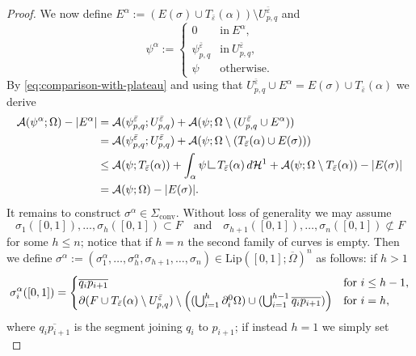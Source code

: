 \documentclass[11pt]{article}
\numberwithin{equation}{section}
\let\eps\varepsilon
\let\Om\Omega
\newcommand{\Lip}{\mathrm{Lip}}
\newcommand{\resa}{\mathop{\hbox{\vrule height 7pt width 0.5pt depth 0pt
\vrule height 0.5pt width 6pt depth 0pt}}\nolimits}
\newcommand{\resb}{\mathop{\hbox{\vrule height 4pt width 0.5pt depth 0pt
\vrule height 0.5pt width 3pt depth 0pt}}\nolimits}
\newcommand{\res}{\mathchoice{\resa}{\resa}{\resb}{\resb}}
\theoremstyle{definition}
\begin{document}
\begin{proof}
We now define $E^\alpha:=(E(\sigma)\cup T_{\bar\eps}(\alpha))\setminus U^{\bar\eps}_{p,q}$ and
\begin{equation*}
\psi^\alpha:=\begin{cases}
0&\text{in}\ E^\alpha,\\
\psi^{\bar\eps}_{p,q}& \text{in}\ U^{\bar\eps}_{p,q}, \\
\psi& \text{otherwise}.
\end{cases}
\end{equation*}
By \eqref{eq:comparison-with-plateau} and using that $U^{\bar\eps}_{p,q}\cup E^\alpha=E(\sigma)\cup T_{\bar\eps}(\alpha)$ we derive
\begin{align}
\mathcal{A}(\psi^\alpha;\Om)-|E^\alpha|
&= \mathcal A(\psi^{\bar\eps}_{p,q};U^{\bar\eps}_{p,q})+
\mathcal{A}(\psi; \Om\setminus(U^{\bar\eps}_{p,q}\cup E^\alpha))\notag
\\
&= \mathcal A(\psi^{\bar\eps}_{p,q};U^{\bar\eps}_{p,q})+
\mathcal{A}(\psi; \Om\setminus(T_{\bar\eps}(\alpha)\cup E(\sigma)))\notag\\[-8pt]\label{eq:area_psi'}\\[-8pt]
&\le \mathcal A(\psi; T_{\bar\eps}(\alpha))+
\int_{\alpha}\psi\res{T_{\bar\eps}(\alpha)}\,d\mathcal{H}^1+\mathcal{A}(\psi; \Omega\setminus T_{\bar\eps}(\alpha))-|E(\sigma)|\notag
\\
&=\mathcal{A}(\psi; \Omega)-|E(\sigma)|.\notag
\end{align}
It remains to construct $\sigma^\alpha\in \Sigma_\mathrm{conv}$. Without loss of generality we may assume
\[
\sigma_1([0,1]),\dots,\sigma_h([0,1])\subset F\quad\text{and}\quad \sigma_{h+1}([0,1]),\dots,\sigma_n([0,1])\not\subset F
\]
for some $h\le n$; notice that if $h=n$ the second family of curves is empty. Then we define $\sigma^\alpha:=(\sigma^\alpha_1,\dots,\sigma_h^\alpha,\sigma_{h+1},\dots,\sigma_n)\in\Lip([0,1];\overline\Om)^n$ as follows: if $h>1$
\begin{equation*}
\sigma^\alpha_{i}([0,1])=\begin{cases}
\overline{q_{i}p_{i+1}}&\text{for } i\leq h-1,\\
\partial (F\cup T_{\bar\eps}(\alpha)\setminus U^{\bar{\eps}}_{p,q})\setminus\Bigl((\bigcup_{i=1}^{h}\partial^0_i\Om)\cup
(\bigcup_{i=1}^{h-1}\overline{q_{i}p_{i+1}})\Bigr)&\text{for } i=h,
\end{cases}
\end{equation*}
where $ \overline{q_{i}p_{i+1}}$ is the segment joining $q_i$ to $p_{i+1}$; if instead $h=1$ we simply set
\begin{equation*}

\end{equation*}
\end{proof}
\end{document}
